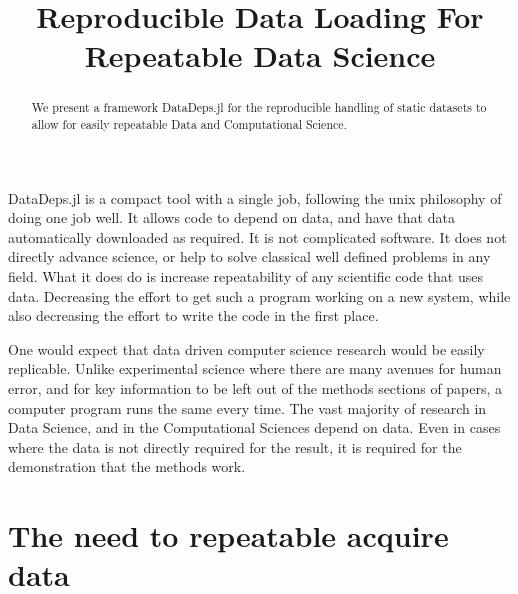 \documentclass[]{article}
\title{Reproducible Data Loading For Repeatable Data Science}
\author{}
\begin{document}
\maketitle

\begin{abstract}
We present a framework DataDeps.jl for the reproducible handling of static datasets to allow for easily repeatable Data and Computational Science.


\end{abstract}

DataDeps.jl is a compact tool with a single job, following the unix philosophy of doing one job well.
It allows code to depend on data, and have that data automatically downloaded as required.
It is not complicated software.
It does not directly advance science, or help to solve classical well defined problems in any field.
What it does do is increase repeatability of any scientific code that uses data.
Decreasing the effort to get such a program working on a new system, while also decreasing the effort to write the code in the first place.


One would expect that data driven computer science research would be easily replicable.
Unlike experimental science where there are many avenues for human error, and for key information to be left out of the methods sections of papers, a computer program runs the same every time.
The vast majority of research in Data Science, and in the Computational Sciences depend on data.
Even in cases where the data is not directly required for the result, it is required for the demonstration that the methods work.




\section{The need to repeatable acquire data}
\end{document}
